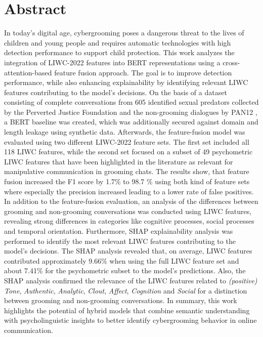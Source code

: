 \chapter{Abstract}

In today's digital age, cybergrooming poses a dangerous threat to the lives of children and young people and requires automatic technologies with high detection performance to support child protection. This work analyzes the integration of LIWC-2022 features \cite{pennebaker2022liwc} into BERT representations \cite{devlin2019bert} using a cross-attention-based feature fusion approach. The goal is to improve detection performance, while also enhancing explainability by identifying relevant LIWC features contributing to the model's decisions. On the basis of a dataset consisting of complete conversations from 605 identified sexual predators collected by the Perverted Justice Foundation and the  non-grooming dialogues by PAN12 \cite{inches2012pan}, a BERT baseline was created, which was additionally secured against domain and length leakage using synthetic data. Afterwards, the feature-fusion model was evaluated using two different LIWC-2022 feature sets. The first set included all 118 LIWC features, while the second set focused on a subset of 49 psychometric LIWC features that have been highlighted in the literature as relevant for manipulative communication in grooming chats. The results show, that feature fusion increased the F1 score by 1.7\% to 98.7 \% using both kind of feature sets where especially the precision increased leading to a lower rate of false positives. In addition to the feature-fusion evaluation, an analysis of the differences between grooming and non-grooming conversations was conducted using LIWC features, revealing strong differences in categories like cognitive processes, social processes and temporal orientation. Furthermore, SHAP \cite{lundberg2017shap} explainability analysis was performed to identify the most relevant LIWC features contributing to the model's decisions. The SHAP analysis revealed that, on average, LIWC features contributed approximately 9.66\% when using the full LIWC feature set and about 7.41\% for the psychometric subset to the model’s predictions. Also, the SHAP analysis confirmed the relevance of the LIWC features related to \textit{(positive) Tone}, \textit{Authentic}, \textit{Analytic}, \textit{Clout}, \textit{Affect}, \textit{Cognition} and \textit{Social} for a distinction between grooming and non-grooming conversations. In summary, this work highlights the potential of hybrid models that combine semantic understanding with psycholinguistic insights to better identify cybergrooming behavior in online communication.
